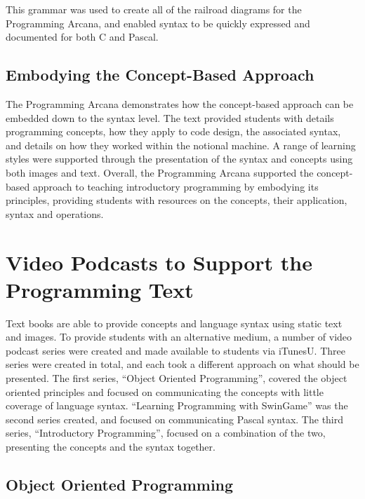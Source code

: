 This grammar was used to create all of the railroad diagrams for the Programming Arcana, and enabled syntax to be quickly expressed and documented for both C and Pascal.


\subsection{Embodying the Concept-Based Approach} %
\label{ssub:arcana_summary}

The Programming Arcana demonstrates how the concept-based approach can be embedded down to the syntax level. The text provided students with details programming concepts, how they apply to code design, the associated syntax, and details on how they worked within the notional machine. A range of learning styles were supported through the presentation of the syntax and concepts using both images and text. Overall, the Programming Arcana supported the concept-based approach to teaching introductory programming by embodying its principles, providing students with resources on the concepts, their application, syntax and operations. 




\section{Video Podcasts to Support the Programming Text} %
\label{sec:vodcasts}

Text books are able to provide concepts and language syntax using static text and images. To provide students with an alternative medium, a number of video podcast series were created and made available to students via iTunesU. Three series were created in total, and each took a different approach on what should be presented. The first series, ``Object Oriented Programming'', covered the object oriented principles and focused on communicating the concepts with little coverage of language syntax. ``Learning Programming with SwinGame'' was the second series created, and focused on communicating Pascal syntax. The third series, ``Introductory Programming'', focused on a combination of the two, presenting the concepts and the syntax together.

\subsection{Object Oriented Programming} %
\label{sub:object_oriented_programming}

